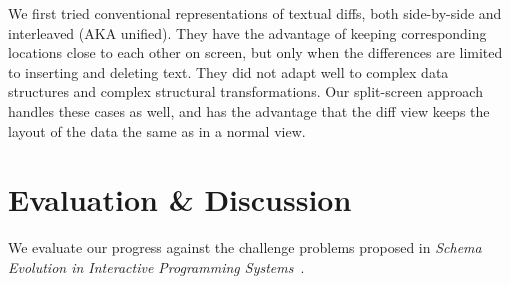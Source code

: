 \documentclass[english,submission]{programming}
\theoremstyle{definition}
\begin{document}
We first tried conventional representations of textual diffs, both side-by-side and interleaved (AKA unified). They have the advantage of keeping corresponding locations close to each other on screen, but only when the differences are limited to inserting and deleting text. They did not adapt well to complex data structures and complex structural transformations. Our split-screen approach handles these cases as well, and has the advantage that the diff view keeps the layout of the data the same as in a normal view.




\section{Evaluation \& Discussion}

We evaluate our progress against the challenge problems proposed in
\textit{Schema Evolution in Interactive Programming Systems}~\cite{challenge-problems}.
\end{document}
